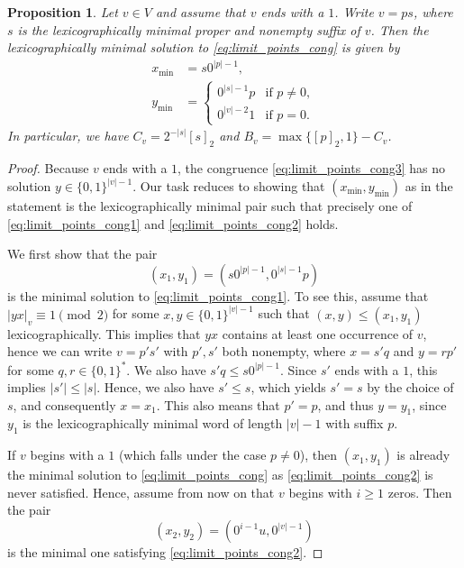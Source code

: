 \documentclass[a4paper,11pt]{amsart}
\newtheorem{prop}[thm]{Proposition}
\theoremstyle{definition}
\begin{document}
\begin{prop} \label{prop:limit_points2}
Let $v \in V$ and assume that $v$ ends with a $1$. Write $v = ps$, where $s$ is the lexicographically minimal proper and nonempty suffix of $v$. Then the lexicographically minimal solution to \eqref{eq:limit_points_cong} is given by 
\begin{align*}
x_{\min} &= s0^{|p|-1}, \\
 y_{\min} &= \begin{cases}
0^{|s|-1} p &\text{if } p \neq 0, \\
0^{|v|-2} 1 &\text{if } p = 0.
\end{cases}
\end{align*}
In particular, we have $C_v = 2^{-|s|} [s]_2$ and $B_v = \max \{[p]_2,1\} - C_v$.
\end{prop}
\begin{proof}
Because $v$ ends with a $1$, the congruence \eqref{eq:limit_points_cong3} has no solution $y \in \{0,1\}^{|v|-1}$. Our task reduces to showing that $(x_{\min},y_{\min})$ as in the statement is the lexicographically minimal pair such that precisely one of \eqref{eq:limit_points_cong1} and \eqref{eq:limit_points_cong2} holds.

We first show that the pair  
$$(x_1,y_1) =  (s 0^{|p|-1},0^{|s|-1} p)$$
is the minimal solution to \eqref{eq:limit_points_cong1}. To see this, assume that $|yx|_{v} \equiv 1 \pmod{2}$ for some $x,y \in \{0,1\}^{|v|-1}$ such that $(x,y) \leq (x_1,y_1)$ lexicographically. This implies that $yx$ contains at least one occurrence of $v$, hence we can write $v = p's'$ with $p',s'$ both nonempty, where $x = s' q$ and $y = r p'$ for some $q,r \in \{0,1\}^*$. We also have $s' q \leq s 0^{|p|-1}$. Since $s'$ ends with a $1$, this implies $|s'| \leq |s|$. Hence, we also have $s' \leq s$, which yields $s'=s$ by the choice of $s$, and consequently $x=x_1$. This also means that $p'=p$, and thus $y=y_1$, since $y_1$ is the lexicographically minimal word of length $|v|-1$ with suffix $p$.
 
If $v$ begins with a $1$ (which falls under the case $p \neq 0$), then $(x_1,y_1)$ is already the minimal solution to \eqref{eq:limit_points_cong} as \eqref{eq:limit_points_cong2} is never satisfied. Hence, assume from now on that $v$ begins with $i \geq 1$ zeros. Then the pair
$$(x_2, y_2) = (0^{i-1} u , 0^{|v|-1})$$
is the minimal one satisfying \eqref{eq:limit_points_cong2}. 


\end{proof}
\end{document}
